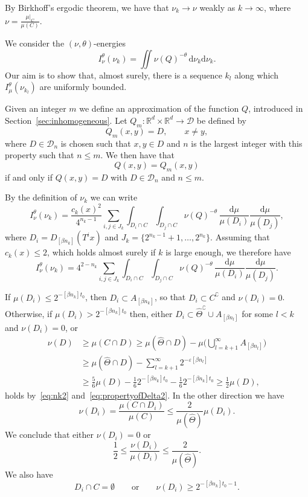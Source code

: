 \documentclass[11pt]{article}
\theoremstyle{definition}
\numberwithin{equation}{section}
\numberwithin{figure}{section}
\numberwithin{table}{section}
\newcommand*{\dd}{\mathrm{d}}
\begin{document}
By Birkhoff's ergodic theorem, we have that $\nu_k \to \nu$ weakly as $k \to \infty$, where $\nu = \frac{\mu|_C}{\mu (C)}$.

We consider the $(\nu, \theta)$-energies
\[
I_\nu^\theta (\nu_k) = \iint \nu (Q)^{-\theta} \, \dd \nu_k
\dd \nu_k.
\]
Our aim is to show that, almost surely, there is a sequence $k_l$ along which $I_\mu^\theta (\nu_{k_l})$ are uniformly bounded.

Given an integer $m$ we define an approximation of the function $Q$, introduced in Section~\ref{sec:inhomogeneous}. Let $Q_m \colon
\mathbb{R}^d \times \mathbb{R}^d \to \mathscr{D}$ be defined by
\[
Q_m (x,y) = D, \qquad x \neq y,
\]
where $D \in \mathscr{D}_n$ is chosen such that $x,y \in D$ and $n$ is the largest integer with this property such that $n \leq m$. We then have that
\[
Q (x,y) = Q_m (x,y)
\]
if and only if $Q (x,y) = D$ with $D \in \mathscr{D}_n$ and $n \leq m$.

By the definition of $\nu_k$ we can write
\[
I_\nu^\theta (\nu_k) = \frac{c_k (x)^2} {4^{n_k-1}} \sum_{i,j \in J_k}
\int_{D_i \cap C} \int_{D_j \cap C} \nu (Q)^{-\theta} \,
\frac{\dd \mu}{\mu (D_i)} \frac{\dd \mu}{\mu (D_j)},
\]
where $D_i = D_{[\beta n_k]} (T^i x)$ and $J_k = \{2^{n_k-1} +1,
\ldots, 2^{n_k} \}$. Assuming that $c_k (x) \leq 2$, which holds almost surely if $k$ is large enough, we therefore have
\begin{equation}\label{eq:nuenergy}
I_\nu^\theta (\nu_k) = 4^{2-n_k} \sum_{i,j \in J_k}
\int_{D_i \cap C} \int_{D_j \cap C} \nu (Q)^{-\theta} \,
\frac{\dd \mu}{\mu (D_i)} \frac{\dd \mu}{\mu (D_j)}.
\end{equation}

If $\mu (D_i) \leq 2^{-[\beta n_k] t_0}$, then $D_i \subset A_{[\beta n_k]}$, so that $D_i \subset C^\complement$ and $\nu (D_i) = 0$. Otherwise, if $\mu (D_i) > 2^{-[\beta n_k] t_0}$ then, either $D_i \subset
\hat{\Theta}^\complement \cup A_{[\beta n_l]}$ for some $l < k$ and $\nu (D_i) = 0$, or
\begin{align*}
\nu (D) &\geq \mu (C \cap D) \geq \mu (\hat{\Theta} \cap D) - \mu
\biggl(\bigcup_{l = k+1}^\infty A_{[\beta n_l]} \biggr) \\ &\geq
\mu (\hat{\Theta} \cap D) - \sum_{l=k+1}^\infty 2^{-\varepsilon [\beta n_l]} \\ &\geq \frac{5}{6} \mu (D) - \frac{1}{6} 2^{-[\beta n_k] t_0} - \frac{1}{6} 2^{-[\beta n_k] t_0} \geq \frac{1}{2}
\mu (D),
\end{align*}
holds by~\eqref{eq:nk2} and~\eqref{eq:propertyofDelta2}. In the other direction we have
\[
\nu (D_i) = \frac{\mu (C \cap D_i)}{\mu (C)} \leq \frac{2}{\mu (\hat{\Theta})} \mu (D_i).
\]
We conclude that either $\nu (D_i) = 0$ or
\begin{equation}\label{eq:mu-nu-ratio}
\frac{1}{2} \leq \frac{\nu (D_i)}{\mu (D_i)} \leq \frac{2}{\mu (\hat{\Theta})}.
\end{equation}
We also have
\begin{equation}\label{eq:nuestimate}
D_i \cap C = \emptyset \qquad \text{or} \qquad \nu (D_i) \geq 2^{-[\beta n_k] t_0 - 1}.
\end{equation}
\end{document}
